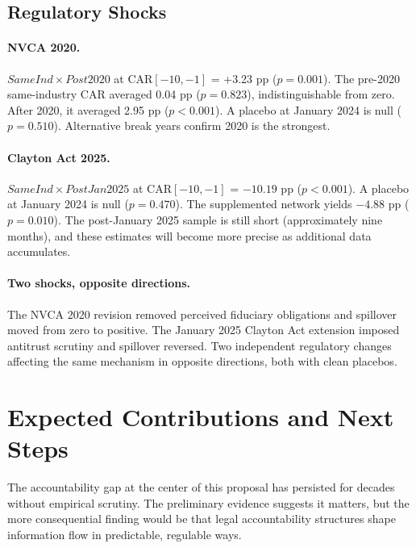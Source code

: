 \documentclass[12pt]{article}
\begin{document}


\subsection{Regulatory Shocks}



\paragraph{NVCA 2020.} $SameInd \times Post2020$ at CAR$[-10,-1]$ = +3.23 pp ($p=0.001$). The pre-2020 same-industry CAR averaged 0.04 pp ($p=0.823$), indistinguishable from zero. After 2020, it averaged 2.95 pp ($p<0.001$). A placebo at January 2024 is null ($p=0.510$). Alternative break years confirm 2020 is the strongest.

\paragraph{Clayton Act 2025.} $SameInd \times PostJan2025$ at CAR$[-10,-1]$ = $-10.19$ pp ($p<0.001$). A placebo at January 2024 is null ($p=0.470$). The supplemented network yields $-4.88$ pp ($p=0.010$). The post-January 2025 sample is still short (approximately nine months), and these estimates will become more precise as additional data accumulates.

\paragraph{Two shocks, opposite directions.} The NVCA 2020 revision removed perceived fiduciary obligations and spillover moved from zero to positive. The January 2025 Clayton Act extension imposed antitrust scrutiny and spillover reversed. Two independent regulatory changes affecting the same mechanism in opposite directions, both with clean placebos.

\section{Expected Contributions and Next Steps}
\label{sec:conclusion}

The accountability gap at the center of this proposal has persisted for decades without empirical scrutiny. The preliminary evidence suggests it matters, but the more consequential finding would be that legal accountability structures shape information flow in predictable, regulable ways.
\end{document}
